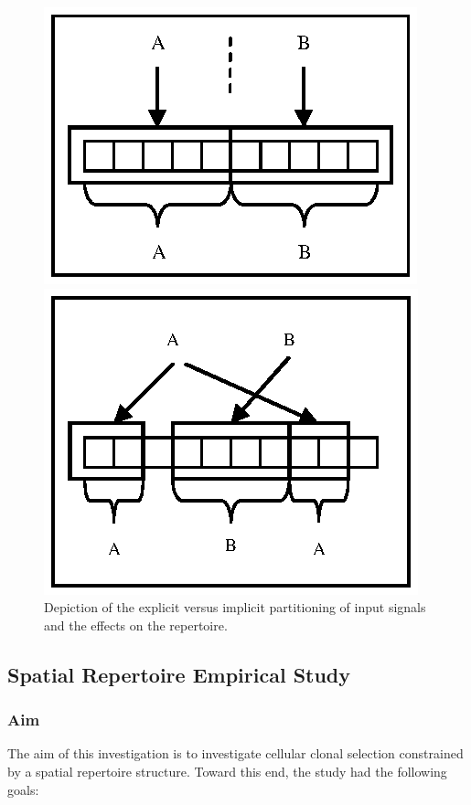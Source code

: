 \begin{figure}[ht]
	\centering
	\begin{minipage}[c]{0.5\linewidth}
		\centering \includegraphics[scale=0.85]{Cells/cells-spatial-partition-explicit}
	\end{minipage}%
	\begin{minipage}[c]{0.5\linewidth}
		\centering \includegraphics[scale=0.85]{Cells/cells-spatial-partition-implicit}
	\end{minipage}
	\caption{Depiction of the explicit versus implicit partitioning of input signals and the effects on the repertoire.}
	\label{pic:cells:spatial:explicit:v:implicit}
\end{figure}

%
%
\subsection{Spatial Repertoire Empirical Study}
%
%
\subsubsection{Aim}
The aim of this investigation is to investigate cellular clonal selection constrained by a spatial repertoire structure. Toward this end, the study had the following goals:


